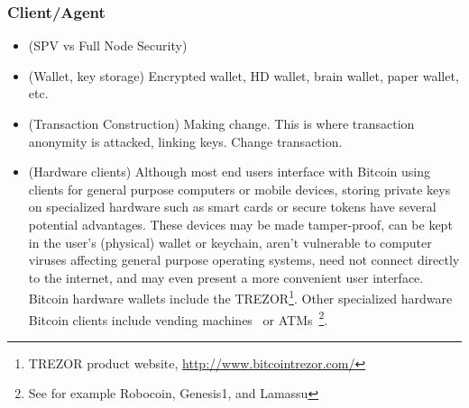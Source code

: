 \subsubsection{Client/Agent}
\begin{itemize}
\item (SPV vs Full Node Security) 
\item (Wallet, key storage) Encrypted wallet, HD wallet, brain wallet, paper wallet, etc.
\item (Transaction Construction) Making change. This is where transaction anonymity is attacked, linking keys. Change transaction.
\item (Hardware clients) Although most end users interface with Bitcoin using clients for general purpose computers or mobile devices, storing private keys on specialized hardware such as smart cards or secure tokens have several potential advantages. These devices may be made tamper-proof, can be kept in the user's (physical) wallet or keychain, aren't vulnerable to computer viruses affecting general purpose operating systems, need not connect directly to the internet, and may even present a more convenient user interface. Bitcoin hardware wallets include the TREZOR\footnote{TREZOR product website, \url{http://www.bitcointrezor.com/}}. Other specialized hardware Bitcoin clients include vending machines~\cite{bitcoinsnack} or ATMs~\footnote{See for example Robocoin, Genesis1, and Lamassu}.
\end{itemize}


